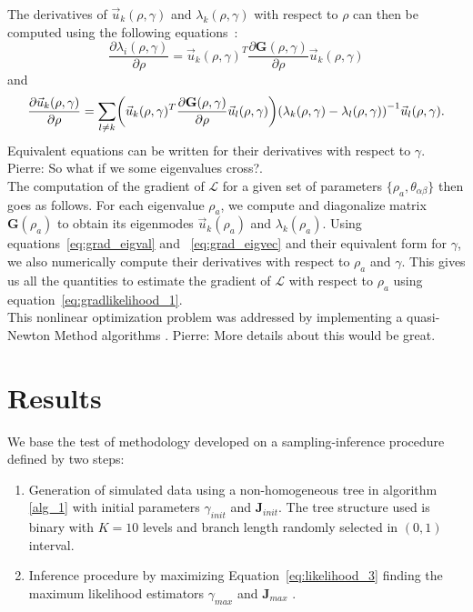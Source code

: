\documentclass[preprint,amsmath,amssymb,superscriptaddress,showpacs,pre]{revtex4-1}
\let\originalleft\left
\let\originalright\right
\renewcommand{\left}{\mathopen{}\mathclose\bgroup\originalleft}
\renewcommand{\right}{\aftergroup\egroup\originalright}
\newcommand{\pierre}[1]{{\color{red}Pierre: #1}}
\begin{document}
The derivatives of $\vec{u}_k(\rho,\gamma)$ and $\lambda_k(\rho,\gamma)$ with respect to $\rho$ can then be computed using the following equations~\cite{matrix_cook_book}: 
\begin{equation}
	\frac{\partial\lambda_i(\rho,\gamma)}{\partial\rho} = \vec{u}_k(\rho,\gamma)^T\frac{\partial\mathbf{G}(\rho,\gamma)}{\partial\rho}\vec{u}_k(\rho,\gamma)
	\label{eq:grad_eigval}
\end{equation}
and
\begin{equation}
	\frac{\partial \vec{u}_k(\rho,\gamma)}{\partial\rho} = \sum_{l\neq k} \left( \vec{u}_k(\rho,\gamma)^T\frac{\partial\mathbf{G}(\rho,\gamma)}{\partial\rho}\vec{u}_l(\rho,\gamma) \right) \left(\lambda_k(\rho,\gamma) - \lambda_l(\rho,\gamma)\right)^{-1} \vec{u}_l(\rho,\gamma).
	\label{eq:grad_eigvec}
\end{equation}
Equivalent equations can be written for their derivatives with respect to $\gamma$. 
\pierre{So what if we some eigenvalues cross?}.\\
The computation of the gradient of $\mathcal{L}$ for a given set of parameters $\{\rho_a, \theta_{\alpha\beta}\}$ then goes as follows. 
For each eigenvalue $\rho_a$, we compute and diagonalize matrix $\mathbf{G}(\rho_a)$ to obtain its eigenmodes $\vec{u}_k(\rho_a)$ and $\lambda_k(\rho_a)$. 
Using equations~\ref{eq:grad_eigval} and ~\ref{eq:grad_eigvec} and their equivalent form for $\gamma$, we also numerically compute their derivatives with respect to $\rho_a$ and $\gamma$. 
This gives us all the quantities to estimate the gradient of $\mathcal{L}$ with respect to $\rho_a$ using equation~\ref{eq:gradlikelihood_1}. \\

 This nonlinear optimization problem was addressed by implementing a quasi-Newton Method algorithms \cite{NLopt}. \pierre{More details about this would be great. }




\section{ Results}
\label{Results}
We base the test of methodology developed on a sampling-inference procedure defined by two steps: 
\begin{enumerate}
\item  Generation of simulated  data using   a non-homogeneous  tree in algorithm \ref{alg_1}  with initial parameters $\gamma_{init}$ and $\bm J_{init}$. The tree structure  used is  binary with $K=10$ levels and   branch length randomly selected in $(0,1)$ interval.
\item Inference procedure by maximizing Equation~\ref{eq:likelihood_3} finding the maximum likelihood estimators $\gamma_{max}$ and $\bm J_{max}$  . 
\end{enumerate}  
\end{document}
